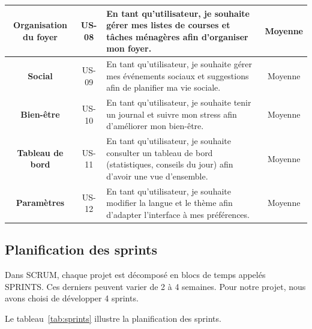 \begin{longtable}{|c|c|p{9cm}|c|}
\textbf{Organisation du foyer} &
US-08 &
En tant qu'utilisateur, je souhaite gérer mes listes de courses et tâches ménagères afin d'organiser mon foyer. &
Moyenne \\ \hline

\textbf{Social} &
US-09 &
En tant qu'utilisateur, je souhaite gérer mes événements sociaux et suggestions afin de planifier ma vie sociale. &
Moyenne \\ \hline

\textbf{Bien-être} &
US-10 &
En tant qu'utilisateur, je souhaite tenir un journal et suivre mon stress afin d'améliorer mon bien-être. &
Moyenne \\ \hline

\textbf{Tableau de bord} &
US-11 &
En tant qu'utilisateur, je souhaite consulter un tableau de bord (statistiques, conseils du jour) afin d'avoir une vue d'ensemble. &
Moyenne \\ \hline

\textbf{Paramètres} &
US-12 &
En tant qu'utilisateur, je souhaite modifier la langue et le thème afin d'adapter l'interface à mes préférences. &
Moyenne \\ \hline

\end{longtable}


\subsection{Planification des sprints}
Dans SCRUM, chaque projet est décomposé en blocs de temps appelés SPRINTS. Ces derniers peuvent varier de 2 à 4 semaines.
Pour notre projet, nous avons choisi de développer 4 sprints.

Le tableau~\ref{tab:sprints} illustre la planification des sprints.

